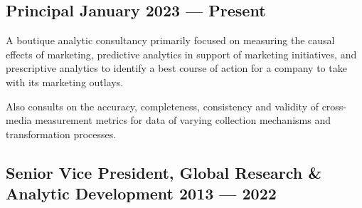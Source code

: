 
\subsection{{Principal \hfill January 2023 --- Present}}
\begin{zitemize}
\item  A boutique analytic consultancy primarily focused on measuring the causal effects of marketing, predictive analytics in support of marketing initiatives, and prescriptive analytics to identify a best course of action for a company to take with its marketing outlays.
\item Also consults on the accuracy, completeness, consistency and validity of cross-media measurement metrics for data of varying collection mechanisms and transformation processes.
\end{zitemize}

\subsection{{Senior Vice President, Global Research \& Analytic Development \hfill 2013 --- 2022}}
